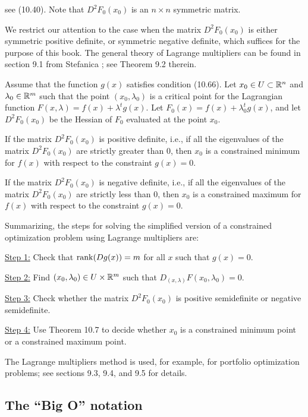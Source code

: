 
see (10.40). Note that $D^2F_0(x_0)$ is an $n \times n$ symmetric matrix.

We restrict our attention to the case when the matrix $D^2F_0(x_0)$ is either
symmetric positive definite, or symmetric negative definite, which suffices for the
purpose of this book. The general theory of Lagrange multipliers can be found in
section 9.1 from Stefanica \cite{36}; see Theorem 9.2 therein.

\begin{theorem}
Assume that the function $g(x)$ satisfies condition (10.66). Let $x_0 \in U \subset
\mathbb{R}^n$ and $\lambda_0 \in \mathbb{R}^m$ such that the point $(x_0,\lambda_0)$ is a critical
point for the Lagrangian function $F(x,\lambda) = f(x) + \lambda^tg(x)$. Let
$F_0(x) = f(x) + \lambda_0^tg(x)$, and let $D^2F_0(x_0)$ be the Hessian of $F_0$
evaluated at the point $x_0$.

If the matrix $D^2F_0(x_0)$ is positive definite, i.e., if all the eigenvalues of the
matrix $D^2F_0(x_0)$ are strictly greater than $0$, then $x_0$ is a constrained
minimum for $f(x)$ with respect to the constraint $g(x) = 0$.

If the matrix $D^2F_0(x_0)$ is negative definite, i.e., if all the eigenvalues of the
matrix $D^2F_0(x_0)$ are strictly less than $0$, then $x_0$ is a constrained maximum
for $f(x)$ with respect to the constraint $g(x) = 0$.
\end{theorem}

Summarizing, the steps for solving the simplified version of a constrained
optimization problem using Lagrange multipliers are:

\medskip
\noindent\underline{Step 1:} Check that $\operatorname{rank}(Dg(x)) = m$ for all $x$ such that
$g(x) = 0$.

\medskip
\noindent\underline{Step 2:} Find $(x_0,\lambda_0) \in U \times \mathbb{R}^m$ such that
$D_{(x,\lambda)}F(x_0,\lambda_0) = 0$.

\medskip
\noindent\underline{Step 3:} Check whether the matrix $D^2F_0(x_0)$ is positive
semidefinite or negative semidefinite.

\medskip
\noindent\underline{Step 4:} Use Theorem 10.7 to decide whether $x_0$ is a
constrained minimum point or a constrained maximum point.

\medskip
The Lagrange multipliers method is used, for example, for portfolio optimization
problems; see sections 9.3, 9.4, and 9.5 for details.

\subsection{The ``Big O'' notation}

